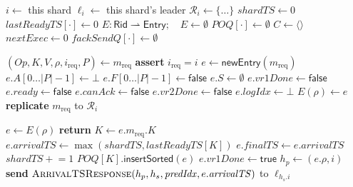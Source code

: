 \begin{algorithm}[!tb]
    \caption{Ellis\_CT Shard Leader: Request Arrival}
    \label{ellis-ct-leader-timestamps}
    \begin{algorithmic}[1]
      \State $i\gets$ this shard
      \State $\ell_i\gets$ this shard's leader
      \State $\mathcal{R}_i\gets\{\ldots\}$
      \State $\mathit{shardTS}\gets 0$
      \State $\mathit{lastReadyTS}[\cdot]\gets 0$
      \State $E:\mathsf{Rid}\rightharpoonup\mathsf{Entry};
        \quad E\gets\emptyset$
      \State $\mathit{POQ}[\cdot]\gets\emptyset$
      \State $C\gets\langle\rangle$
      \State $\mathit{nextExec}\gets 0$
      \State $\mathit{fackSendQ}[\cdot]\gets\emptyset$

        \State $(\textit{Op},K,V,\rho,i_{\mathrm{req}},P)\gets m_{\mathrm{req}}$
        \State \textbf{assert} $i_{\mathrm{req}}=i$
        \State $e\gets\mathsf{newEntry}(m_{\mathrm{req}})$
        \State $e.A[0\ldots |P|-1]\gets\bot$
        \State $e.F[0\ldots |P|-1]\gets\mathsf{false}$
        \State $e.S\gets\emptyset$
        \State $e.\mathit{vr1Done}\gets\mathsf{false}$
        \State $e.\mathit{ready}\gets\mathsf{false}$
        \State $e.\mathit{canAck}\gets\mathsf{false}$
        \State $e.\mathit{vr2Done}\gets\mathsf{false}$
        \State $e.\mathit{logIdx}\gets\bot$
        \State $E(\rho)\gets e$
        \State \textbf{replicate} $m_{\mathrm{req}}$ to $\mathcal{R}_i$
      \EndProcedure
  
      \Procedure{\leaderVROneQuorum}{$\rho$}
        \State $e\gets E(\rho)$
          \State \textbf{return}
        \EndIf
        \State $K\gets e.m_{\mathrm{req}}.K$
        \State $e.\mathit{arrivalTS}\gets
          \max(\mathit{shardTS},\mathit{lastReadyTS}[K])$
        \State $e.\mathit{finalTS}\gets e.\mathit{arrivalTS}$
        \State $\mathit{shardTS}\mathrel{+}=1$
        \State $\mathit{POQ}[K].\mathsf{insertSorted}(e)$
        \State $e.\mathit{vr1Done}\gets\mathsf{true}$
        \State $h_p\gets(e.\rho,i)$
          \State \textbf{send} $\textsc{ArrivalTSResponse}(h_p, h_s,\mathit{predIdx}, e.\mathit{arrivalTS})$
            to $\ell_{h_s.i}$
        \EndFor
  

\end{algorithmic}
\end{algorithm}
